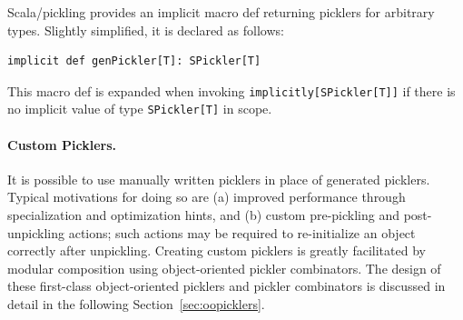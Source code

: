 \documentclass[preprint,10pt]{sigplanconf}
\theoremstyle{definition}
\theoremstyle{definition}
\begin{document}
Scala/pickling provides an implicit macro def returning picklers for arbitrary
types. Slightly simplified, it is declared as follows:

\begin{lstlisting}
implicit def genPickler[T]: SPickler[T]
\end{lstlisting}

This macro def is expanded when invoking \newline
\verb|implicitly[SPickler[T]]| if
there is no implicit value of type \verb|SPickler[T]| in scope.


\paragraph{Custom Picklers.} It is possible to use manually written picklers
in place of generated picklers. Typical motivations for doing so are (a)
improved performance through specialization and optimization hints, and (b) custom pre-pickling and post-unpickling
actions; such actions may be required to re-initialize an object
correctly after unpickling. Creating custom picklers is greatly facilitated by
modular composition using object-oriented pickler combinators. The design of
these first-class object-oriented picklers and pickler combinators is
discussed in detail in the following Section~\ref{sec:oopicklers}.




\end{document}
